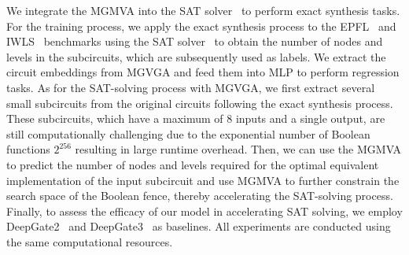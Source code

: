 We integrate the MGMVA into the SAT solver~\citep{haaswijk2019sat} to perform exact synthesis tasks.
For the training process, we apply the exact synthesis process to the EPFL~\citep{EPFLBenchmarks2015} and IWLS~\citep{albrecht2005iwls} benchmarks using the SAT solver~\citep{haaswijk2019sat} to obtain the number of nodes and levels in the subcircuits, which are subsequently used as labels.
We extract the circuit embeddings from MGVGA and feed them into MLP to perform regression tasks.
As for the SAT-solving process with MGVGA, we first extract several small subcircuits from the original circuits following the exact synthesis process.
These subcircuits, which have a maximum of 8 inputs and a single output, are still computationally challenging due to the exponential number of Boolean functions $2^{256}$ resulting in large runtime overhead.
Then, we can use the MGMVA to predict the number of nodes and levels required for the optimal equivalent implementation of the input subcircuit and use MGMVA to further constrain the search space of the Boolean fence, thereby accelerating the SAT-solving process. 
Finally, to assess the efficacy of our model in accelerating SAT solving, we employ DeepGate2~\citep{shi2023deepgate2} and DeepGate3~\citep{shi2024deepgate3} as baselines. 
All experiments are conducted using the same computational resources.

